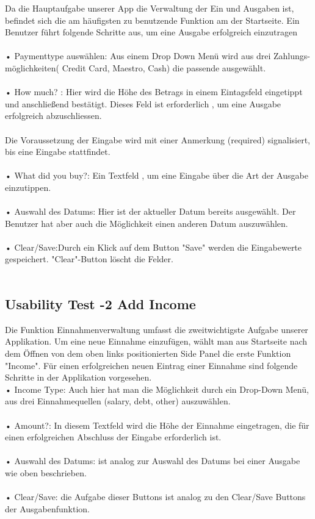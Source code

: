 \documentclass[runningheads,a4paper]{llncs}
\begin{document}
Da die Hauptaufgabe unserer App die Verwaltung der Ein und Ausgaben ist, befindet sich die am häufigsten zu benutzende Funktion am der Startseite. Ein Benutzer führt folgende Schritte aus, um eine Ausgabe erfolgreich einzutragen\\\\
•	Paymenttype auswählen:  Aus einem Drop Down Menü wird aus drei Zahlungs-möglichkeiten( Credit Card, Maestro, Cash) die passende ausgewählt.\\\\
•	How much? : Hier wird die Höhe des Betrags in einem Eintagsfeld eingetippt und anschließend bestätigt. Dieses Feld ist erforderlich , um eine Ausgabe erfolgreich abzuschliessen.\\\\
	Die Voraussetzung der Eingabe wird  mit einer Anmerkung (required) signalisiert, bis eine Eingabe stattfindet.\\\\
•	What did you buy?: Ein Textfeld , um eine Eingabe über die Art der Ausgabe einzutippen.\\\\
•	Auswahl des Datums: Hier ist der aktueller Datum bereits ausgewählt. Der Benutzer hat aber auch die Möglichkeit einen anderen Datum auszuwählen.\\\\
•	Clear/Save:Durch ein Klick auf dem Button "Save" werden die Eingabewerte gespeichert. "Clear"-Button löscht die Felder.\\\\



\subsection{Usability Test -2 Add Income}
 Die Funktion Einnahmenverwaltung umfasst die zweitwichtigste Aufgabe unserer Applikation. Um eine neue Einnahme einzufügen, wählt man aus Startseite nach dem Öffnen von dem oben links positionierten Side Panel die erste Funktion "Income". Für einen erfolgreichen neuen Eintrag einer Einnahme sind folgende Schritte in der Applikation vorgesehen.\\

•	Income Type: Auch hier hat man die Möglichkeit durch ein Drop-Down Menü, aus drei Einnahmequellen (salary, debt, other) auszuwählen. \\\\
•	Amount?: In diesem Textfeld wird die Höhe der Einnahme eingetragen, die für einen erfolgreichen Abschluss der Eingabe erforderlich ist.\\\\
•	Auswahl des Datums: ist analog zur Auswahl des Datums bei einer Ausgabe wie oben beschrieben.\\\\
•	Clear/Save: die Aufgabe dieser Buttons ist analog zu den Clear/Save Buttons der Ausgabenfunktion.\\\\
\end{document}
